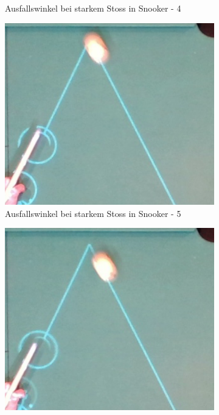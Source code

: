 \begin{figure}[h!]
\begin{subfigure}[b]{0.2\textwidth}
        \caption{Ausfallswinkel bei starkem Stoss in Snooker - 4}
        \label{fig:rebound_angle_fast_snooker_4}
    \end{subfigure}
    \hfill
    \begin{subfigure}[b]{0.2\textwidth}
        \centering
        \includegraphics[width=1.0\linewidth]{../common/04_results/resources/simulation/rebound_angle_fast_snooker/00_rail_rebound_angle_fast_snooker_05.png}
        \caption{Ausfallswinkel bei starkem Stoss in Snooker - 5}
        \label{fig:rebound_angle_fast_snooker_5}
    \end{subfigure}
    \hfill
    \begin{subfigure}[b]{0.2\textwidth}
        \centering
        \includegraphics[width=1.0\linewidth]{../common/04_results/resources/simulation/rebound_angle_fast_snooker/00_rail_rebound_angle_fast_snooker_06.png}

\end{subfigure}
\end{figure}
